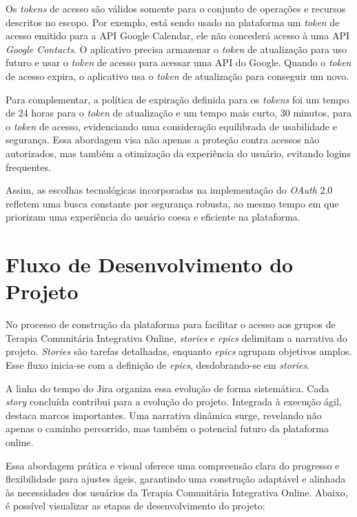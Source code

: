 Os \textit{tokens} de acesso são válidos somente para o conjunto de operações e recursos descritos no escopo. Por exemplo, está sendo usado na plataforma um \textit{token} de acesso emitido para a API Google Calendar, ele não concederá acesso à uma API \textit{Google Contacts}. O aplicativo precisa armazenar o \textit{token} de atualização para uso futuro e usar o \textit{token} de acesso para acessar uma API do Google. Quando o \textit{token} de acesso expira, o aplicativo usa o \textit{token} de atualização para conseguir um novo.

Para complementar, a política de expiração definida para os \textit{tokens} foi um tempo de 24 horas para o \textit{token} de atualização e um tempo mais curto, 30 minutos, para o \textit{token} de acesso, evidenciando uma consideração equilibrada de usabilidade e segurança. Essa abordagem visa não apenas a proteção contra acessos não autorizados, mas também a otimização da experiência do usuário, evitando logins frequentes.

Assim, as escolhas tecnológicas incorporadas na implementação do \textit{OAuth} 2.0 refletem uma busca constante por segurança robusta, ao mesmo tempo em que priorizam uma experiência do usuário coesa e eficiente na plataforma.

\section{Fluxo de Desenvolvimento do Projeto}

    No processo de construção da plataforma para facilitar o acesso aos grupos de Terapia Comunitária Integrativa Online, \textit{stories} e \textit{epics} delimitam a narrativa do projeto. \textit{Stories} são tarefas detalhadas, enquanto \textit{epics} agrupam objetivos amplos. Esse fluxo inicia-se com a definição de \textit{epics}, desdobrando-se em \textit{stories}.

    A linha do tempo do Jira organiza essa evolução de forma sistemática.
    Cada \textit{story} concluída contribui para a evolução do projeto. Integrada à execução ágil, destaca marcos importantes. Uma narrativa dinâmica surge, revelando não apenas o caminho percorrido, mas também o potencial futuro da plataforma online.

    Essa abordagem prática e visual oferece uma compreensão clara do progresso e flexibilidade para ajustes ágeis, garantindo uma construção adaptável e alinhada às necessidades dos usuários da Terapia Comunitária Integrativa Online.  Abaixo, é possível visualizar as etapas de desenvolvimento do projeto:
    
